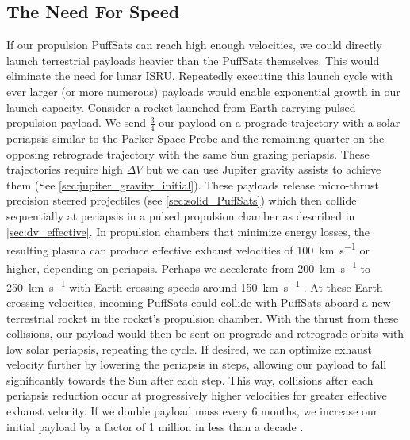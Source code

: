 \documentclass{article}
\begin{document}
{\subsection{The Need For Speed} \label{sec:no_isru_rocket}\cite{topgun1986needforspeed}
If our propulsion PuffSats can reach high enough velocities, we could directly launch terrestrial payloads heavier than the PuffSats themselves.   This would eliminate the need for lunar ISRU. Repeatedly executing this launch cycle with ever larger (or more numerous) payloads would enable exponential growth in our launch capacity. Consider a rocket launched from Earth carrying pulsed propulsion payload.   We send $\frac{3}{4}$ our payload on a prograde trajectory with a solar periapsis similar to the Parker Space Probe and the remaining quarter on the opposing retrograde trajectory with the same Sun grazing periapsis.  These trajectories require high $\Delta V$ but we can use Jupiter gravity assists to achieve them (See \autoref{sec:jupiter_gravity_initial}).   These payloads release micro-thrust precision steered projectiles (see \autoref{sec:solid_PuffSats}) which then collide sequentially at periapsis in a pulsed propulsion chamber as described in \autoref{sec:dv_effective}. In propulsion chambers that minimize energy losses, the resulting plasma can produce effective exhaust velocities of \SI{100}{\kilo\meter\per\second} or higher, depending on periapsis. Perhaps we accelerate from \SI{200}{\kilo\meter\per\second} to \SI{250}{\kilo\meter\per\second} with Earth crossing speeds around \SI{150}{\kilo\meter\per\second} \cite{Katz_aim_is_all_you_need_2025}.  At these Earth crossing velocities, incoming PuffSats could collide with PuffSats aboard a new terrestrial rocket in the rocket's propulsion chamber.  With the thrust from these collisions, our payload would then be sent on prograde and retrograde orbits with low solar periapsis, repeating the cycle.  If desired, we can optimize exhaust velocity further by lowering the periapsis in steps, allowing our payload to fall significantly towards the Sun after each step.  This way, collisions after each periapsis reduction occur at progressively higher velocities for greater effective exhaust velocity.   If we double payload mass every 6 months, we increase our initial payload by a factor of 1 million in less than a decade \cite{Katz_aim_is_all_you_need_2025}. 

}
\end{document}
